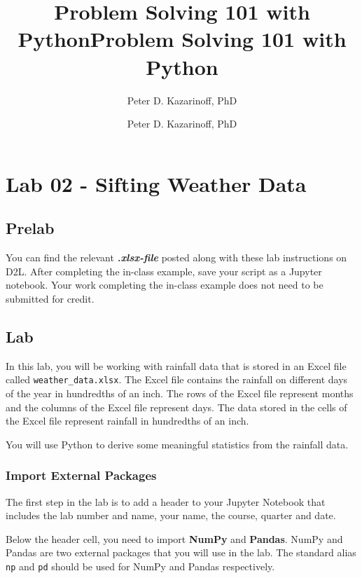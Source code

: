 \documentclass[11pt]{article}
\title{Problem Solving 101 with Python}
\author{Peter D. Kazarinoff, PhD}
\date{}
\title{Problem Solving 101 with Python}
\author{Peter D. Kazarinoff, PhD}
\date{}
\begin{document}
    
    
    

    
    

    
    \hypertarget{lab-02---sifting-weather-data}{%
\section{Lab 02 - Sifting Weather
Data}\label{lab-02---sifting-weather-data}}

    \hypertarget{prelab}{%
\subsection{Prelab}\label{prelab}}

You can find the relevant \textbf{\emph{.xlsx-file}} posted along with
these lab instructions on D2L. After completing the in-class example,
save your script as a Jupyter notebook. Your work completing the
in-class example does not need to be submitted for credit.

    \hypertarget{lab}{%
\subsection{Lab}\label{lab}}

In this lab, you will be working with rainfall data that is stored in an
Excel file called \texttt{weather\_data.xlsx}. The Excel file contains
the rainfall on different days of the year in hundredths of an inch. The
rows of the Excel file represent months and the columns of the Excel
file represent days. The data stored in the cells of the Excel file
represent rainfall in hundredths of an inch.

You will use Python to derive some meaningful statistics from the
rainfall data.

    \hypertarget{import-external-packages}{%
\subsubsection{Import External
Packages}\label{import-external-packages}}

The first step in the lab is to add a header to your Jupyter Notebook
that includes the lab number and name, your name, the course, quarter
and date.

Below the header cell, you need to import \textbf{NumPy} and
\textbf{Pandas}. NumPy and Pandas are two external packages that you
will use in the lab. The standard alias \texttt{np} and \texttt{pd}
should be used for NumPy and Pandas respectively.
\end{document}
